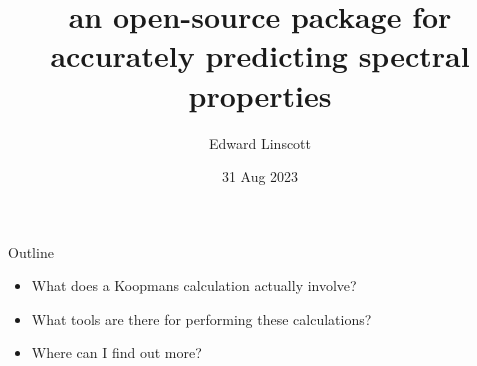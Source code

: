 \documentclass[xcolor=table,aspectratio=169]{beamer}
\title{\noindent\large{an open-source package for accurately predicting spectral properties}}
\author{Edward Linscott}
\institute{EPFL}
\date{31 Aug 2023}
\numberwithin{equation}{section}
\begin{document}
\frame{\titlepage}

\begin{frame}{Outline}

   \begin{itemize}
      \item What does a Koopmans calculation actually involve?
      \item What tools are there for performing these calculations?
      \item Where can I find out more?
   \end{itemize}

\end{frame}


\end{document}
